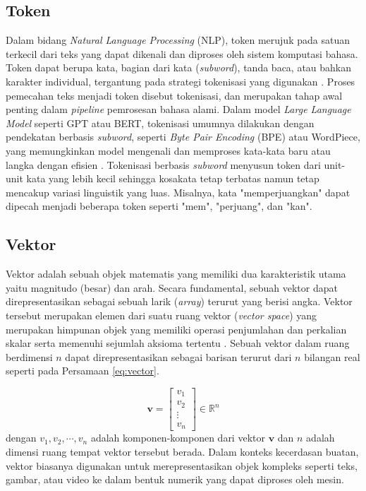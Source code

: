 \subsection{Token}
Dalam bidang \textit{Natural Language Processing} (NLP), token merujuk pada satuan terkecil dari teks yang dapat dikenali dan diproses oleh sistem komputasi bahasa.
Token dapat berupa kata, bagian dari kata (\textit{subword}), tanda baca, atau bahkan karakter individual, tergantung pada strategi tokenisasi yang digunakan \cite{Jurafsky2023SpeechLangageProcessing}.
Proses pemecahan teks menjadi token disebut tokenisasi, dan merupakan tahap awal penting dalam \textit{pipeline} pemrosesan bahasa alami.
Dalam model \textit{Large Language Model} seperti GPT atau BERT, tokenisasi umumnya dilakukan dengan pendekatan berbasis \textit{subword}, seperti \textit{Byte Pair Encoding} (BPE) atau WordPiece, yang memungkinkan model mengenali dan memproses kata-kata baru atau langka dengan efisien \cite{bostrom2020BytePairWordPieceToken}.
Tokenisasi berbasis \textit{subword} menyusun token dari unit-unit kata yang lebih kecil sehingga kosakata tetap terbatas namun tetap mencakup variasi linguistik yang luas.
Misalnya, kata "memperjuangkan" dapat dipecah menjadi beberapa token seperti "mem", "perjuang", dan "kan".


\subsection{Vektor}
Vektor adalah sebuah objek matematis yang memiliki dua karakteristik utama yaitu magnitudo (besar) dan arah.
Secara fundamental, sebuah vektor dapat direpresentasikan sebagai sebuah larik (\textit{array}) terurut yang berisi angka.
Vektor tersebut merupakan elemen dari suatu ruang vektor (\textit{vector space}) yang merupakan himpunan objek yang memiliki operasi penjumlahan dan perkalian skalar serta memenuhi sejumlah aksioma tertentu \cite{strang2009IntroductionLinearAlgebra}.
Sebuah vektor dalam ruang berdimensi $n$ dapat direpresentasikan sebagai barisan terurut dari $n$ bilangan real seperti pada Persamaan \ref{eq:vector}.
\def\V{
	\begin{bmatrix}
		v_1    \\
		v_2    \\
		\vdots \\
		v_n
	\end{bmatrix}
}

\begin{equation}
	\mathbf{v} = \V \in \mathbb{R}^n
	\label{eq:vector}
\end{equation}%
dengan $v_1, v_2, \cdots, v_n$ adalah komponen-komponen dari vektor $\mathbf{v}$ dan $n$ adalah dimensi ruang tempat vektor tersebut berada.
Dalam konteks kecerdasan buatan, vektor biasanya digunakan untuk merepresentasikan objek kompleks seperti teks, gambar, atau video ke dalam bentuk numerik yang dapat diproses oleh mesin.


